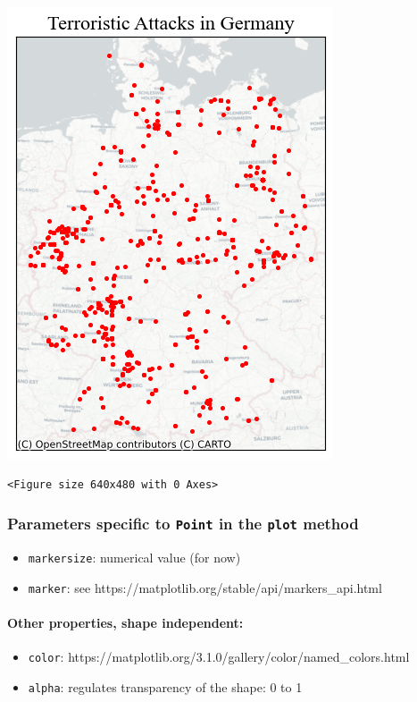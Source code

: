 \documentclass[
  letterpaper,
  DIV=11,
  numbers=noendperiod]{scrreprt}
\let\oldparagraph\paragraph
\renewcommand{\paragraph}[1]{\oldparagraph{#1}\mbox{}}
\providecommand{\tightlist}{%
  \setlength{\itemsep}{0pt}\setlength{\parskip}{0pt}}\usepackage{longtable,booktabs,array}
\begin{document}
\includegraphics{labs/w02_maps_files/figure-pdf/cell-7-output-1.png}

\begin{verbatim}
<Figure size 640x480 with 0 Axes>
\end{verbatim}

\subsubsection{\texorpdfstring{Parameters specific to \texttt{Point} in
the \texttt{plot}
method}{Parameters specific to Point in the plot method}}\label{parameters-specific-to-point-in-the-plot-method}

\begin{itemize}
\tightlist
\item
  \texttt{markersize}: numerical value (for now)
\item
  \texttt{marker}: see
  https://matplotlib.org/stable/api/markers\_api.html
\end{itemize}

\paragraph{Other properties, shape
independent:}\label{other-properties-shape-independent}

\begin{itemize}
\tightlist
\item
  \texttt{color}:
  https://matplotlib.org/3.1.0/gallery/color/named\_colors.html
\item
  \texttt{alpha}: regulates transparency of the shape: 0 to 1
\end{itemize}
\end{document}
